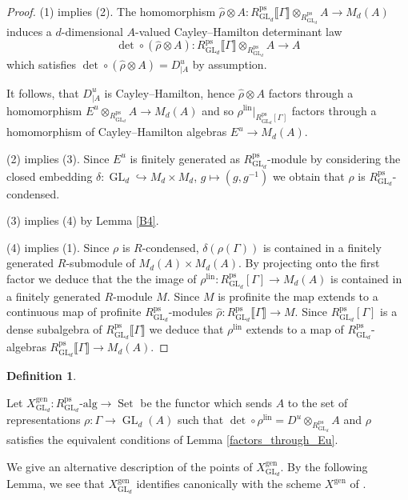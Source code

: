 \documentclass{amsart}
\theoremstyle{definition}
\newtheorem{defi}[prop]{Definition}
\theoremstyle{remark}
\DeclareMathOperator{\GL}{GL}
\DeclareMathOperator{\Set}{Set}
\newcommand{\br}[1]{\llbracket #1\rrbracket}
\newcommand{\alg}{\mathrm{alg}}
\newcommand{\ps}{\mathrm{ps}}
\newcommand{\gen}{\mathrm{gen}}
\newcommand{\RpsGLd}{R^{\ps}_{\GL_d}}
\newcommand{\lin}{\mathrm{lin}}
\newcommand{\XgenGLd}{X^{\gen}_{\GL_d}}
\newcommand{\hyphen}{\text{-}}
\begin{document}
\begin{proof}
    (1) implies (2). The homomorphism $\widehat\rho \otimes A : \RpsGLd\br{\Gamma} \otimes_{\RpsGLd} A \to M_d(A)$ induces a $d$-dimensional $A$-valued Cayley--Hamilton determinant law 
    $$ \det \circ (\widehat\rho \otimes A) : \RpsGLd\br{\Gamma} \otimes_{\RpsGLd} A \to A$$
    which satisfies $\det \circ (\widehat\rho \otimes A) = D^u_{|A}$ by assumption. 

    It follows, that $D^u_{|A}$ is Cayley--Hamilton, hence $\widehat\rho \otimes A$ factors 
    through a homomorphism $E^u \otimes_{\RpsGLd} A \to M_d(A)$ and so 
    $\rho^{\lin}|_{\RpsGLd[\Gamma]}$ factors through a homomorphism of Cayley--Hamilton 
    algebras $E^u\rightarrow M_d(A)$.

    (2) implies (3). Since $E^u$ is finitely generated as $\RpsGLd$-module by considering the closed embedding 
    $\delta: \GL_d\hookrightarrow M_d\times M_d$, $g\mapsto (g, g^{-1})$ we obtain that $\rho$
    is $\RpsGLd$-condensed.

    (3) implies (4) by Lemma \ref{B4}. 

    (4) implies (1).  Since $\rho$ is $R$-condensed, 
    $\delta(\rho(\Gamma))$ is contained in a finitely generated $R$-submodule 
    of $M_d(A)\times M_d(A)$. By projecting onto the first factor we deduce that the 
    the image of $\rho^{\lin}: \RpsGLd[\Gamma]\rightarrow M_d(A)$ is contained in 
    a finitely generated $R$-module $M$. Since $M$ is profinite the map extends
    to a continuous map of profinite $\RpsGLd$-modules $\widehat{\rho}:\RpsGLd\br{\Gamma}\rightarrow M$. Since $\RpsGLd[\Gamma]$ is a dense subalgebra of $\RpsGLd\br{\Gamma}$ we deduce
    that $\rho^{\lin}$ extends to a map of $\RpsGLd$-algebras $\RpsGLd\br{\Gamma}\rightarrow 
    M_d(A)$.
\end{proof}



\begin{defi}\label{defXgenGLd} 

    Let $\XgenGLd : \RpsGLd\hyphen\alg \to \Set$ be the functor which sends $A$ to the 
    set of  representations $\rho: \Gamma\rightarrow \GL_d(A)$ such that 
    $\det \circ \rho^{\lin}= D^u \otimes_{\RpsGLd} A$ and $\rho$ satisfies the equivalent conditions
    of Lemma \ref{factors_through_Eu}.
    \end{defi}

We give an alternative description of the points of $\XgenGLd$. By the following Lemma, we see that $\XgenGLd$ identifies canonically with the scheme $X^{\gen}$ of \cite{BIP_new}.
\end{document}

